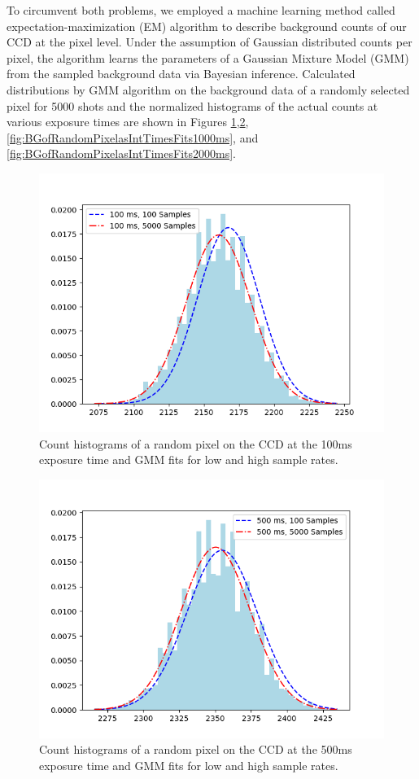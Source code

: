 To circumvent both problems, we employed a machine learning method called 
expectation-maximization (EM) algorithm to describe background counts of our CCD 
at the pixel level. Under the assumption of Gaussian distributed counts per pixel, 
the algorithm learns the parameters of a Gaussian Mixture Model (GMM) from 
the sampled background data via Bayesian inference. Calculated distributions by GMM
algorithm on the background data of a randomly selected pixel for 5000 shots and the normalized histograms of the actual counts at various exposure times are shown 
in Figures
\ref{fig:BGofRandomPixelasIntTimesFits100ms},\ref{fig:BGofRandomPixelasIntTimesFits500ms}, \ref{fig:BGofRandomPixelasIntTimesFits1000ms}, and \ref{fig:BGofRandomPixelasIntTimesFits2000ms}.

\begin{figure}[H]
	\centering
	\includegraphics[angle=0,origin=c,width = 0.8\linewidth]{Section_ODMR/Figures/Pixel2550_100msFits.png}
	\caption{Count histograms of a random pixel on the CCD at the 100ms exposure time and GMM fits for low and high
		 sample rates.}
	\label{fig:BGofRandomPixelasIntTimesFits100ms}
\end{figure}

\begin{figure}[H]
	\centering
	\includegraphics[angle=0,origin=c,width = 0.8\linewidth]{Section_ODMR/Figures/Pixel2550_500msFits.png}
	\caption{Count histograms of a random pixel on the CCD at the 500ms exposure time and GMM fits for low and high
		sample rates.}
	\label{fig:BGofRandomPixelasIntTimesFits500ms}
\end{figure}

